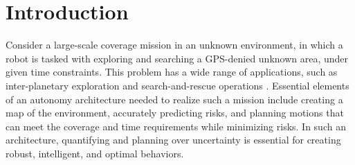 \documentclass[letterpaper]{article} %
\newcommand{\phdone}[1]{} %
\newcommand{\acomm}[1]{{\color{cyan}Ali:#1}} %
\begin{document}
\section{Introduction}\label{sec:intro}

\phdone{High-level mission}
Consider a large-scale coverage mission in an unknown environment, in which a robot is tasked with exploring and searching a GPS-denied unknown area, under given time constraints. This problem has a wide range of applications, such as inter-planetary exploration and search-and-rescue operations \cite{blank2020robotic,nagatani2013emergency}. %
Essential elements of an autonomy architecture needed to realize such a mission include creating a map of the environment, accurately predicting risks, and planning motions that can meet the coverage and time requirements while minimizing risks.  In such an architecture, quantifying and planning over uncertainty is essential for creating robust, intelligent, and optimal behaviors.
\end{document}
